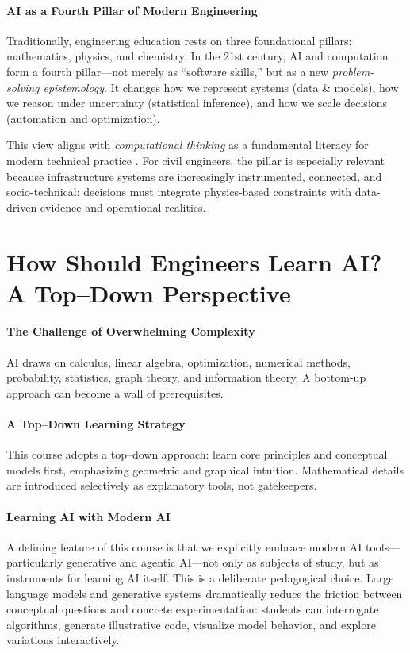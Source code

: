 \documentclass[12pt]{article}
\begin{document}
\paragraph{AI as a Fourth Pillar of Modern Engineering}
Traditionally, engineering education rests on three foundational pillars: mathematics, physics, and chemistry. In the 21st century, AI and computation form a fourth pillar—not merely as ``software skills,'' but as a new \emph{problem-solving epistemology}. It changes how we represent systems (data \& models), how we reason under uncertainty (statistical inference), and how we scale decisions (automation and optimization).

This view aligns with \emph{computational thinking} as a fundamental literacy for modern technical practice \cite{wing_2006}. For civil engineers, the pillar is especially relevant because infrastructure systems are increasingly instrumented, connected, and socio-technical: decisions must integrate physics-based constraints with data-driven evidence and operational realities.



\section*{How Should Engineers Learn AI? A Top--Down Perspective}
\paragraph{The Challenge of Overwhelming Complexity}
AI draws on calculus, linear algebra, optimization, numerical methods, probability, statistics, graph theory, and information theory. A bottom-up approach can become a wall of prerequisites.

\paragraph{A Top--Down Learning Strategy}
This course adopts a top--down approach: learn core principles and conceptual models first, emphasizing geometric and graphical intuition. Mathematical details are introduced selectively as explanatory tools, not gatekeepers.

\paragraph{Learning AI with Modern AI}
A defining feature of this course is that we explicitly embrace modern AI tools—particularly generative and agentic AI—not only as subjects of study, but as instruments for learning AI itself. This is a deliberate pedagogical choice. Large language models and generative systems dramatically reduce the friction between conceptual questions and concrete experimentation: students can interrogate algorithms, generate illustrative code, visualize model behavior, and explore variations interactively.
\end{document}
